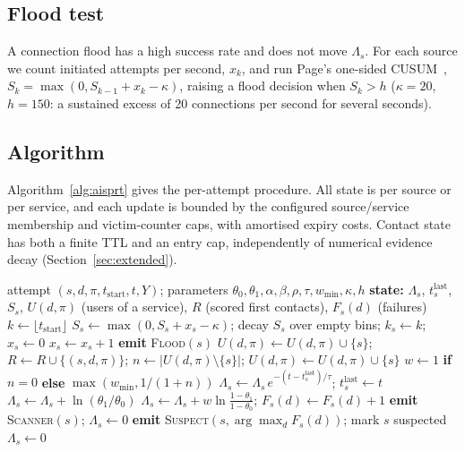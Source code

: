\documentclass[conference]{IEEEtran}
\begin{document}
\subsection{Flood test}
A connection flood has a high success rate and does not move $\Lambda_s$. For each source we count initiated attempts
per second, $x_k$, and run Page's one-sided CUSUM~\cite{page1954cusum}, $S_k=\max(0,S_{k-1}+x_k-\kappa)$, raising a flood
decision when $S_k>h$ ($\kappa=20$, $h=150$: a sustained excess of 20 connections per second for several seconds).

\subsection{Algorithm}
Algorithm~\ref{alg:aisprt} gives the per-attempt procedure. All state is per source or per service, and each update is
bounded by the configured source/service membership and victim-counter caps, with amortised expiry costs. Contact
state has both a finite TTL and an entry cap, independently of numerical evidence decay (Section~\ref{sec:extended}).

\begin{algorithm}[!tbp]
\caption{AIS-SPRT: per resolved initiated attempt}\label{alg:aisprt}
\begin{algorithmic}[1]
\Require attempt $(s,d,\pi,t_{\text{start}},t,Y)$; parameters $\theta_0,\theta_1,\alpha,\beta,\rho,\tau,w_{\min},\kappa,h$
\State \textbf{state:} $\Lambda_s$, $t^{\text{last}}_s$, $S_s$, $U(d,\pi)$ (users of a service), $R$ (scored first contacts), $F_s(d)$ (failures)
\State $k\gets\lfloor t_{\text{start}}\rfloor$ 
 \State $S_s\gets\max(0,S_s+x_s-\kappa)$; decay $S_s$ over empty bins; $k_s\gets k$; $x_s\gets0$ \EndIf
\State $x_s\gets x_s+1$
 \State \textbf{emit} \textsc{Flood}$(s)$ \EndIf
{} \State $U(d,\pi)\gets U(d,\pi)\cup\{s\}$; \Return {} \EndIf
\State $R\gets R\cup\{(s,d,\pi)\}$; \quad $n\gets|U(d,\pi)\setminus\{s\}|$; \quad $U(d,\pi)\gets U(d,\pi)\cup\{s\}$
\State $w\gets 1$ \textbf{if} $n=0$ \textbf{else} $\max(w_{\min},1/(1+n))$
\State $\Lambda_s\gets\Lambda_s\,e^{-(t-t^{\text{last}}_s)/\tau}$; \quad $t^{\text{last}}_s\gets t$
 \State $\Lambda_s\gets\Lambda_s+\ln(\theta_1/\theta_0)$
\Else \State $\Lambda_s\gets\Lambda_s+w\ln\frac{1-\theta_1}{1-\theta_0}$; \quad $F_s(d)\gets F_s(d)+1$ \EndIf
{} \State \textbf{emit} \textsc{Scanner}$(s)$; \quad $\Lambda_s\gets0$
  \State \textbf{emit} \textsc{Suspect}$(s,\arg\max_d F_s(d))$; mark $s$ suspected
 \State $\Lambda_s\gets0$  \EndIf
\end{algorithmic}
\end{algorithm}
\end{document}

